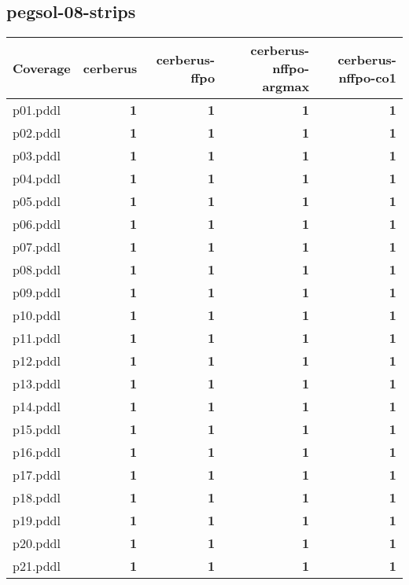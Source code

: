 \documentclass{article}
\begin{document}
\hypertarget{coverage-pegsol-08-strips}{}
\subsection*{pegsol-08-strips}

\begin{tabular}{@{}lrrrr@{}}
Coverage & cerberus & cerberus-ffpo & cerberus-nffpo-argmax & cerberus-nffpo-co1 \\
\midrule
p01.pddl & \textbf{1} & \textbf{1} & \textbf{1} & \textbf{1} \\
p02.pddl & \textbf{1} & \textbf{1} & \textbf{1} & \textbf{1} \\
p03.pddl & \textbf{1} & \textbf{1} & \textbf{1} & \textbf{1} \\
p04.pddl & \textbf{1} & \textbf{1} & \textbf{1} & \textbf{1} \\
p05.pddl & \textbf{1} & \textbf{1} & \textbf{1} & \textbf{1} \\
p06.pddl & \textbf{1} & \textbf{1} & \textbf{1} & \textbf{1} \\
p07.pddl & \textbf{1} & \textbf{1} & \textbf{1} & \textbf{1} \\
p08.pddl & \textbf{1} & \textbf{1} & \textbf{1} & \textbf{1} \\
p09.pddl & \textbf{1} & \textbf{1} & \textbf{1} & \textbf{1} \\
p10.pddl & \textbf{1} & \textbf{1} & \textbf{1} & \textbf{1} \\
p11.pddl & \textbf{1} & \textbf{1} & \textbf{1} & \textbf{1} \\
p12.pddl & \textbf{1} & \textbf{1} & \textbf{1} & \textbf{1} \\
p13.pddl & \textbf{1} & \textbf{1} & \textbf{1} & \textbf{1} \\
p14.pddl & \textbf{1} & \textbf{1} & \textbf{1} & \textbf{1} \\
p15.pddl & \textbf{1} & \textbf{1} & \textbf{1} & \textbf{1} \\
p16.pddl & \textbf{1} & \textbf{1} & \textbf{1} & \textbf{1} \\
p17.pddl & \textbf{1} & \textbf{1} & \textbf{1} & \textbf{1} \\
p18.pddl & \textbf{1} & \textbf{1} & \textbf{1} & \textbf{1} \\
p19.pddl & \textbf{1} & \textbf{1} & \textbf{1} & \textbf{1} \\
p20.pddl & \textbf{1} & \textbf{1} & \textbf{1} & \textbf{1} \\
p21.pddl & \textbf{1} & \textbf{1} & \textbf{1} & \textbf{1} \\

\end{tabular}
\end{document}
